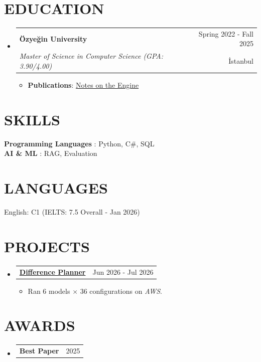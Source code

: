 \documentclass[letterpaper,11pt]{article}
\makeatletter
\newcommand{\resumeItem}[1]{
  \item\small{
    {#1 \vspace{-1pt}}
  }
}
\newcommand{\resumeSubheading}[4]{
  \vspace{-1pt}\item
    \begin{tabular*}{\textwidth}[t]{l@{\extracolsep{\fill}}r}
      \textbf{#1} & {\color{dark-grey}\small #2}\vspace{1pt}\\ %
      \textit{#3} & {\color{dark-grey} \small #4}\\ %
    \end{tabular*}\vspace{-4pt}
}
\newcommand{\resumeProjectHeading}[2]{
    \item
    \begin{tabular*}{\textwidth}{l@{\extracolsep{\fill}}r}
      #1 & {\color{dark-grey}\small #2} \\ %
    \end{tabular*}\vspace{-4pt}
}
\newcommand{\resumeSubHeadingListStart}{\begin{itemize}[leftmargin=0in, label={}]}
\newcommand{\resumeSubHeadingListEnd}{\end{itemize}}
\newcommand{\resumeItemListStart}{\begin{itemize}}
\newcommand{\resumeItemListEnd}{\end{itemize}\vspace{0pt}}
\makeatother
\begin{document}
\section{EDUCATION}
  \resumeSubHeadingListStart
    \resumeSubheading
      {\"{O}zye\u{g}in University}{Spring 2022 - Fall 2025}
      {Master of Science in Computer Science (GPA: 3.90/4.00)}{\.{I}stanbul}
      \resumeItemListStart
        \resumeItem{\textbf{Publications}: \href{https://example.org/paper\#1}{Notes on the Engine}}
      \resumeItemListEnd
  \resumeSubHeadingListEnd

\section{SKILLS}
 \begin{itemize}[leftmargin=0in, label={}]
    \small{\item{
     \textbf{Programming Languages} {: Python, C\#, SQL} \\
     \textbf{AI \& ML} {: RAG, Evaluation} \\
     }}
\end{itemize}

\section{LANGUAGES}
\begin{itemize}[leftmargin=0in, label={}]
    \small{\item{
     English: C1 (IELTS: 7.5 Overall - Jan 2026) \\
     }}
\end{itemize}

\section{PROJECTS}
    \resumeSubHeadingListStart
    \resumeProjectHeading
        {\href{https://example.org/planner}{\textbf{Difference Planner}}}{Jun 2026 - Jul 2026}
            \resumeItemListStart
                \resumeItem{Ran 6 models $\times$ 36 configurations on \textit{AWS}.}
            \resumeItemListEnd
    \resumeSubHeadingListEnd

\section{AWARDS}
    \resumeSubHeadingListStart
    \resumeProjectHeading
        {\textbf{Best Paper}}{2025}
    \resumeSubHeadingListEnd

\end{document}
